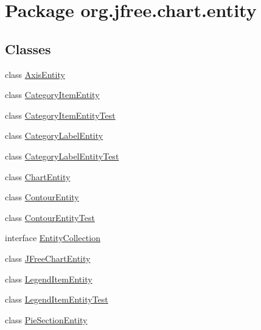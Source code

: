 \hypertarget{namespaceorg_1_1jfree_1_1chart_1_1entity}{}\section{Package org.\+jfree.\+chart.\+entity}
\label{namespaceorg_1_1jfree_1_1chart_1_1entity}
\subsection*{Classes}
\begin{DoxyCompactItemize}
\item 
class \mbox{\hyperlink{classorg_1_1jfree_1_1chart_1_1entity_1_1_axis_entity}{Axis\+Entity}}
\item 
class \mbox{\hyperlink{classorg_1_1jfree_1_1chart_1_1entity_1_1_category_item_entity}{Category\+Item\+Entity}}
\item 
class \mbox{\hyperlink{classorg_1_1jfree_1_1chart_1_1entity_1_1_category_item_entity_test}{Category\+Item\+Entity\+Test}}
\item 
class \mbox{\hyperlink{classorg_1_1jfree_1_1chart_1_1entity_1_1_category_label_entity}{Category\+Label\+Entity}}
\item 
class \mbox{\hyperlink{classorg_1_1jfree_1_1chart_1_1entity_1_1_category_label_entity_test}{Category\+Label\+Entity\+Test}}
\item 
class \mbox{\hyperlink{classorg_1_1jfree_1_1chart_1_1entity_1_1_chart_entity}{Chart\+Entity}}
\item 
class \mbox{\hyperlink{classorg_1_1jfree_1_1chart_1_1entity_1_1_contour_entity}{Contour\+Entity}}
\item 
class \mbox{\hyperlink{classorg_1_1jfree_1_1chart_1_1entity_1_1_contour_entity_test}{Contour\+Entity\+Test}}
\item 
interface \mbox{\hyperlink{interfaceorg_1_1jfree_1_1chart_1_1entity_1_1_entity_collection}{Entity\+Collection}}
\item 
class \mbox{\hyperlink{classorg_1_1jfree_1_1chart_1_1entity_1_1_j_free_chart_entity}{J\+Free\+Chart\+Entity}}
\item 
class \mbox{\hyperlink{classorg_1_1jfree_1_1chart_1_1entity_1_1_legend_item_entity}{Legend\+Item\+Entity}}
\item 
class \mbox{\hyperlink{classorg_1_1jfree_1_1chart_1_1entity_1_1_legend_item_entity_test}{Legend\+Item\+Entity\+Test}}
\item 
class \mbox{\hyperlink{classorg_1_1jfree_1_1chart_1_1entity_1_1_pie_section_entity}{Pie\+Section\+Entity}}

\end{DoxyCompactItemize}
